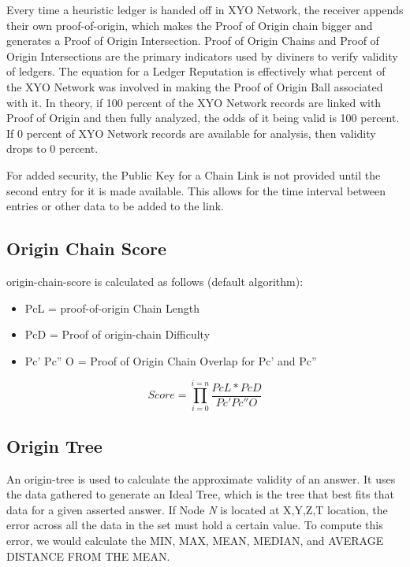 \documentclass{article}
\begin{document}
Every time a \gls{heuristic} ledger is handed off in XYO Network, the receiver appends their own \Gls{proof-of-origin}, which makes the Proof of Origin chain bigger and generates a Proof of Origin Intersection. Proof of Origin Chains and Proof of Origin Intersections are the primary indicators used by \Glspl{diviner} to verify validity of ledgers. The equation for a Ledger Reputation is effectively what percent of the XYO Network was involved in making the Proof of Origin Ball associated with it. In theory, if 100 percent of the XYO Network records are linked with Proof of Origin and then fully analyzed, the odds of it being valid is 100 percent. If 0 percent of XYO Network records are available for analysis, then validity drops to 0 percent.

For added security, the Public Key for a Chain Link is not provided until the second entry for it is made available. This allows for the time interval between entries or other data to be added to the link.

\subsection {Origin Chain Score}
\Gls{origin-chain-score} is calculated as follows (default algorithm):

\begin{itemize}
\item PcL = \Gls{proof-of-origin} Chain Length
\item PcD = Proof of \Gls{origin-chain} Difficulty
\item Pc' Pc'' O = Proof of Origin Chain Overlap for Pc' and Pc''
\end{itemize}

\begin{equation*}\tag{1} \label{eq1}
Score = \prod_{i=0}^{i=n} \frac{PcL*PcD}{Pc' Pc'' O}
\end{equation*}

\subsection {Origin Tree}
An \Gls{origin-tree} is used to calculate the approximate validity of an answer. It uses the data gathered to generate an Ideal Tree, which is the tree that best fits that data for a given asserted answer. If Node \textit{N} is located at X,Y,Z,T location, the error across all the data in the set must hold a certain value. To compute this error, we would calculate the MIN, MAX, MEAN, MEDIAN, and AVERAGE DISTANCE FROM THE MEAN.
\end{document}

